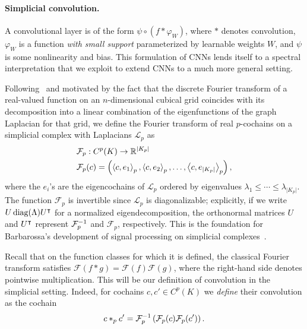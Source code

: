 \paragraph{Simplicial convolution.}

A convolutional layer is of the form $\psi\circ(f\ast \varphi_W)$, where $\ast$ denotes convolution, $\varphi_W$ is a function
\emph{with small support} parameterized by learnable weights $W$, and $\psi$ is some nonlinearity and bias. This formulation of CNNs lends itself to a spectral interpretation that we exploit to extend CNNs to a much more general setting.

Following~\cite{defferrard2016convolutional} and motivated by the fact that the discrete Fourier transform of a real-valued function on an $n$-dimensional cubical grid coincides with its decomposition into a linear combination of the eigenfunctions of the graph Laplacian for that grid, we define the Fourier transform of real $p$-cochains on a simplicial complex with Laplacians $\mathcal{L}_p$ as
\begin{align*}
  &\mathcal{F}_p: C^p(K) \to \mathbb{R}^{\lvert K_p \rvert} \\
  &\mathcal{F}_p(c) = \left(\left\langle c , e_1 \right\rangle_p, \left\langle c , e_2 \right\rangle_p, \dotsc, \left\langle c , e_{\lvert K_p \rvert} \right\rangle_p\right),
\end{align*}
where the $e_i$'s are the eigencochains of $\mathcal{L}_p$ ordered by eigenvalues $\lambda_1\leq\dotsm\leq\lambda_{\lvert K_p \rvert}$. The function $\mathcal{F}_p$ is invertible since $\mathcal{L}_p$ is diagonalizable; explicitly, if we write $U\operatorname{diag}(\Lambda)U^{\intercal}$ for a normalized eigendecomposition, the orthonormal matrices $U$ and $U^{\intercal}$ represent $\mathcal{F}^{-1}_p$ and $\mathcal{F}_p$, respectively. This is the foundation for Barbarossa's development of signal processing on simplicial complexes~\cite{barbarossa2018learning}.

Recall that on the function classes for which it is defined, the classical Fourier transform satisfies $\mathcal{F}(f\ast g)=\mathcal{F}(f)\mathcal{F}(g)$, where the right-hand side denotes pointwise multiplication. This will be our definition of convolution in the simplicial setting. Indeed, for cochains $c,c'\in C^p(K)$ we \emph{define} their convolution as the cochain
\begin{equation*}
  c\ast_p c' = \mathcal{F}_p^{-1}\left(\mathcal{F}_p(c)\mathcal{F}_p(c')\right). 
\end{equation*}

